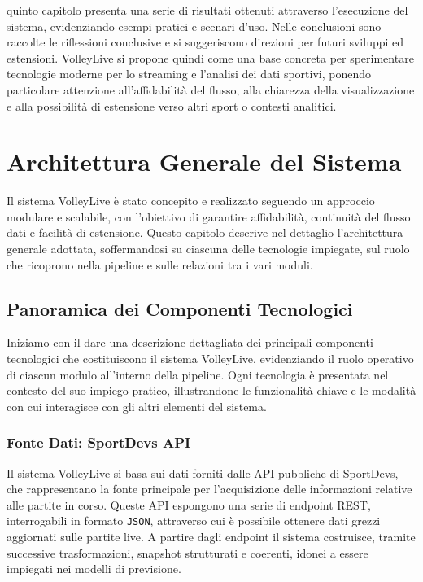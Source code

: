 \documentclass[a4paper,12pt]{report}
\begin{document}
quinto capitolo presenta una serie di risultati ottenuti attraverso l’esecuzione del sistema, evidenziando esempi pratici e scenari d’uso. Nelle conclusioni sono raccolte le riflessioni conclusive e si suggeriscono direzioni per futuri sviluppi ed estensioni. VolleyLive si propone quindi come una base concreta per sperimentare tecnologie moderne per lo streaming e l’analisi dei dati sportivi, ponendo particolare attenzione all’affidabilità del flusso, alla chiarezza della visualizzazione e alla possibilità di estensione verso altri sport o contesti analitici.


\chapter{Architettura Generale del Sistema}

Il sistema VolleyLive è stato concepito e realizzato seguendo un approccio modulare e scalabile, con l’obiettivo di garantire affidabilità, continuità del flusso dati e facilità di estensione. Questo capitolo descrive nel dettaglio l’architettura generale adottata, soffermandosi su ciascuna delle tecnologie impiegate, sul ruolo che ricoprono nella pipeline e sulle relazioni tra i vari moduli.


\section{Panoramica dei Componenti Tecnologici}

Iniziamo con il dare una descrizione dettagliata dei principali componenti tecnologici che costituiscono il sistema VolleyLive, evidenziando il ruolo operativo di ciascun modulo all’interno della pipeline. Ogni tecnologia è presentata nel contesto del suo impiego pratico, illustrandone le funzionalità chiave e le modalità con cui interagisce con gli altri elementi del sistema.


\subsection{Fonte Dati: SportDevs API}

Il sistema VolleyLive si basa sui dati forniti dalle API pubbliche di SportDevs, che rappresentano la fonte principale per l’acquisizione delle informazioni relative alle partite in corso. Queste API espongono una serie di endpoint REST, interrogabili in formato \texttt{JSON}, attraverso cui è possibile ottenere dati grezzi aggiornati sulle partite live. A partire dagli endpoint il sistema costruisce, tramite successive trasformazioni, snapshot strutturati e coerenti, idonei a essere impiegati nei modelli di previsione.
\end{document}
